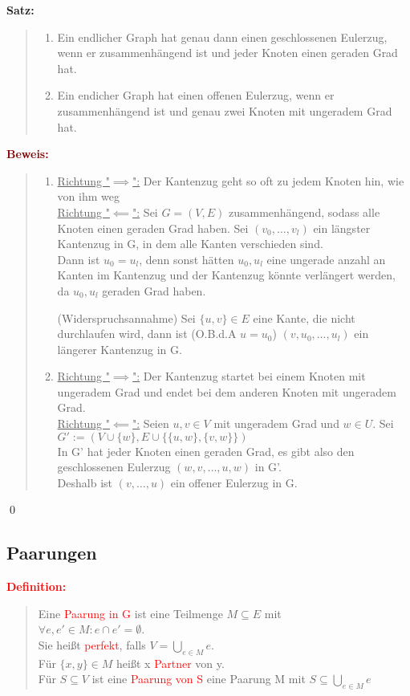 \documentclass{article}
\newcommand{\red}[1]{\textcolor{red}{#1}}
\newcommand{\dgr}[1]{\textcolor{dgr}{#1}}
\newcommand{\maroon}[1]{\textcolor{maroon}{#1}}
\newcommand{\de}[1]{\red{\textbf{Definition: }}\begin{quote}#1\end{quote}}
\newcommand{\se}[1]{\dgr{\textbf{Satz: }}\begin{quote}#1\end{quote}}
\newcommand{\pr}[1]{\maroon{\textbf{Beweis: }}\begin{quote}#1\end{quote}\qed}
\begin{document}
\newpage
\se{
    \begin{enumerate}
        \item Ein endlicher Graph hat genau dann einen geschlossenen Eulerzug, wenn er zusammenhängend ist und jeder Knoten einen geraden Grad hat.
        \item Ein endicher Graph hat einen offenen Eulerzug, wenn er zusammenhängend ist und genau zwei Knoten mit ungeradem Grad hat.
    \end{enumerate}
}

\pr{
    \begin{enumerate}
        \item \underline{Richtung "$\implies$":} Der Kantenzug geht so oft zu jedem Knoten hin, wie von ihm weg\\
        \underline{Richtung "$\impliedby$":} Sei $G =(V,E)$ zusammenhängend, sodass alle Knoten einen geraden Grad haben. Sei $(v_0, \dots, v_l)$ ein längster Kantenzug in G, in dem alle Kanten verschieden sind.\\
        Dann ist $u_0 = u_l$, denn sonst hätten $u_0,u_l$ eine ungerade anzahl an Kanten im Kantenzug und der Kantenzug könnte verlängert werden, da $u_0,u_l$ geraden Grad haben.

        (Widerspruchsannahme) Sei $\{u,v\} \in E$ eine Kante, die nicht durchlaufen wird, dann ist (O.B.d.A $u = u_0$) $(v,u_0,\dots,u_l)$ ein längerer Kantenzug in G.

        \item \underline{Richtung "$\implies$":} Der Kantenzug startet bei einem Knoten mit ungeradem Grad und endet bei dem anderen Knoten mit ungeradem Grad.\\
        \underline{Richtung "$\impliedby$":} Seien $u,v \in V$ mit ungeradem Grad und $w \in U$. Sei $G':=(V \cup \{w\}, E \cup \{\{u,w\}, \{v,w\}\})$\\
        In G' hat jeder Knoten einen geraden Grad, es gibt also den geschlossenen Eulerzug $(w,v,\dots,u,w)$ in G'.\\
        Deshalb ist $(v,\dots,u)$ ein offener Eulerzug in G.
    \end{enumerate}
}

\subsection{Paarungen}

\de{
    Eine \red{Paarung in G} ist eine Teilmenge $M \subseteq E$ mit\\
    $\forall e, e' \in M: e \cap e' = \emptyset$.\\
    Sie heißt \red{perfekt}, falls $V = \bigcup_{e \in M} e$.\\
    Für $\{x,y\} \in M$ heißt x \red{Partner} von y.\\
    Für $S \subseteq V$ ist eine \red{Paarung von S} eine Paarung M mit $S \subseteq \bigcup_{e \in M} e$
}
\end{document}
